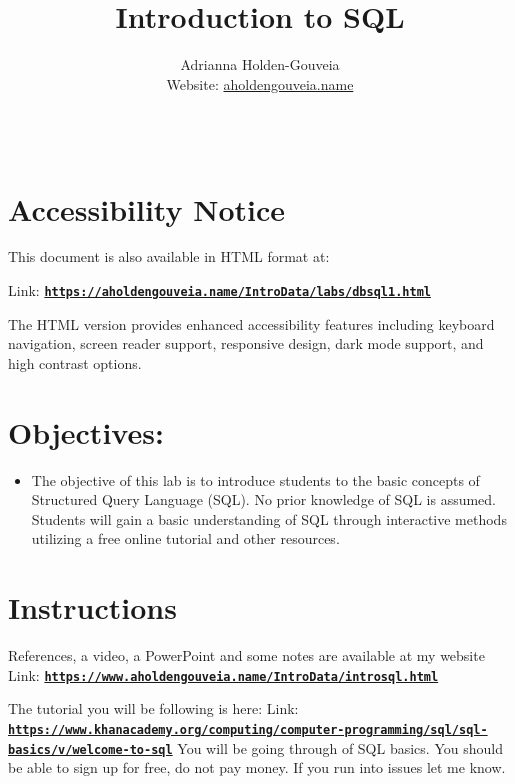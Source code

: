 \documentclass[12pt]{article}
\title{Introduction to SQL}
\author{
        Adrianna Holden-Gouveia \\
        Website: \href{https://aholdengouveia.name}{aholdengouveia.name}\\ 
        \date{\vspace{-5ex}}
        \faGithub {: aholdengouveia} \\
        }
\begin{document}
    

\maketitle



\section*{Accessibility Notice}
This document is also available in HTML format at:

Link: \href{https://aholdengouveia.name/IntroData/labs/dbsql1.html}{\textbf{\nolinkurl{https://aholdengouveia.name/IntroData/labs/dbsql1.html}}}

The HTML version provides enhanced accessibility features including keyboard navigation, screen reader support, responsive design, dark mode support, and high contrast options.

\section*{Objectives:}
\begin{itemize}
    \item The objective of this lab is to introduce students to the basic concepts of Structured Query Language (SQL). No prior knowledge of SQL is assumed. Students will gain a basic understanding of SQL through interactive methods utilizing a free online tutorial and other resources.
\end{itemize}
\section*{Instructions}

References, a video, a PowerPoint and some notes are available at my website
Link: \href{https://www.aholdengouveia.name/IntroData/introsql.html}{\textbf{\nolinkurl{https://www.aholdengouveia.name/IntroData/introsql.html}}}

The tutorial you will be following is here: Link: \href{https://www.khanacademy.org/computing/computer-programming/sql/sql-basics/v/welcome-to-sql}{\textbf{\nolinkurl{https://www.khanacademy.org/computing/computer-programming/sql/sql-basics/v/welcome-to-sql}}} You will be going through of SQL basics.  You should be able to sign up for free, do not pay money. If you run into issues let me know.
\end{document}
